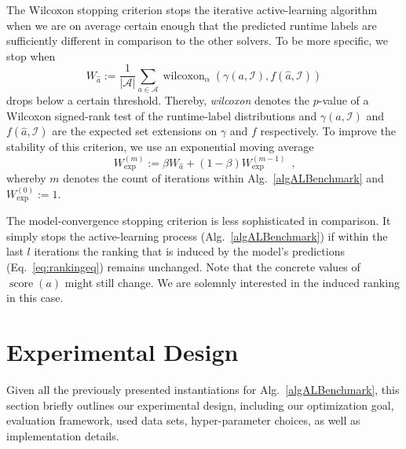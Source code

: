 \documentclass[runningheads]{llncs}
\begin{document}
The Wilcoxon stopping criterion stops the iterative active-learning algorithm when we are on average certain enough that the predicted runtime labels are sufficiently different in comparison to the other solvers.
To be more specific, we stop when
\begin{equation}
  W_{\hat{a}} := \frac{1}{\left\lvert \mathcal{A} \right\rvert} \sum_{a \in \mathcal{A}} \operatorname{wilcoxon}_{\alpha}\!\left(\gamma\!\left(a, \mathcal{I}\right), f\!\left(\hat{a}, \mathcal{I}\right) \right)
\end{equation}
drops below a certain threshold.
Thereby, \emph{wilcoxon} denotes the $p$-value of a Wilcoxon signed-rank test of the runtime-label distributions and $\gamma\!\left(a, \mathcal{I}\right)$ and $f\!\left(\hat{a}, \mathcal{I}\right)$ are the expected set extensions on $\gamma$ and $f$ respectively.
To improve the stability of this criterion, we use an exponential moving average
\begin{equation}
  W_{\exp}^{\left(m\right)} := \beta W_{\hat{a}} + \left(1 - \beta\right) W_{\exp}^{\left(m - 1\right)} \enspace \textrm{,}
\end{equation}
whereby $m$ denotes the count of iterations within Alg.~\ref{algALBenchmark} and $W_{\exp}^{\left(0\right)} := 1$.

The model-convergence stopping criterion is less sophisticated in comparison.
It simply stops the active-learning process (Alg.~\ref{algALBenchmark}) if within the last $l$ iterations the ranking that is induced by the model's predictions (Eq.~\ref{eq:rankingeq}) remains unchanged.
Note that the concrete values of $\operatorname{score}\!\left(a\right)$ might still change.
We are solemnly interested in the induced ranking in this case.


\section{Experimental Design}
Given all the previously presented instantiations for Alg.~\ref{algALBenchmark}, this section briefly outlines our experimental design, including our optimization goal, evaluation framework, used data sets, hyper-parameter choices, as well as implementation details.
\end{document}

